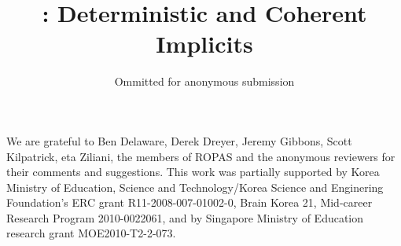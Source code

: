 \documentclass[acmlarge, anonymous, review]{acmart}
\begin{document}

\title{\name: Deterministic and Coherent Implicits}
\author{Ommitted for anonymous submission}

\begin{abstract}

\end{abstract}

\begin{comment}
\category{D.3.2}{Programming Languages}   
                {Language Classifications}
                [Functional Languages, Object-Oriented Languages]
\category{F.3.3}{Logics and Meanings of Programs}   
                {Studies of Program Constructs}
                []

\terms{Languages}

\keywords{
Implicit parameters, type classes, C++ concepts, generic programming,
Haskell, Scala}

\acmformat{Oliveira, B. C. d. S., Schrijvers, T., Choi, W., Lee, W., Yi, K., Wadler, P.
201?. The implicit calculus: a new foundation for generic programming.}

\begin{bottomstuff}
Author's addresses: 
B. C. d. S. Oliveira, Department of Computer Science, Hong Kong University; 
T. Schrijvers, Department of Applied Mathematics and Computer Science, Ghent University;
W. Choi {and} W. Lee {and} K. Yi, \ldots, Seoul National University;
P. Wadler, \ldots, University of Edinburgh.
\end{bottomstuff}
\end{comment}

\maketitle











%






\begin{acks}
We are grateful to Ben Delaware, Derek Dreyer, Jeremy Gibbons, Scott
Kilpatrick, eta Ziliani, the members of ROPAS and the
anonymous reviewers for their comments and suggestions.  This work was
partially supported by Korea Ministry of Education, Science and
Technology/Korea Science and Enginering Foundation's ERC grant
R11-2008-007-01002-0, Brain Korea 21, Mid-career Research Program 2010-0022061, and
by Singapore Ministry of Education research grant MOE2010-T2-2-073.
\end{acks}
\end{document}
